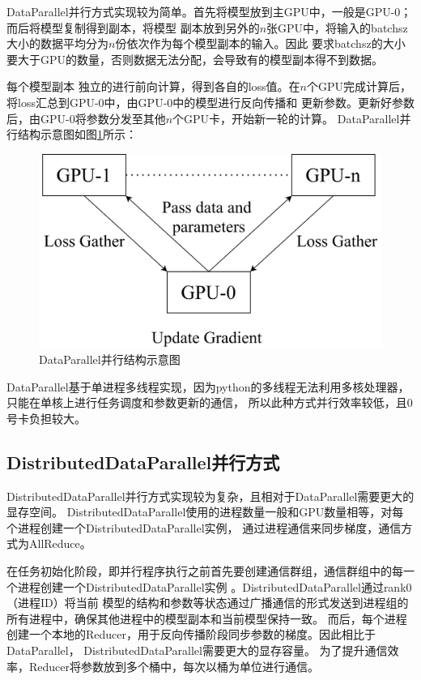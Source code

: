 DataParallel并行方式实现较为简单。首先将模型放到主GPU中，一般是GPU-0；而后将模型复制得到副本，将模型
副本放到另外的$n$张GPU中，将输入的batchsz大小的数据平均分为$n$份依次作为每个模型副本的输入。因此
要求batchsz的大小要大于GPU的数量，否则数据无法分配，会导致有的模型副本得不到数据。

每个模型副本
独立的进行前向计算，得到各自的loss值。在$n$个GPU完成计算后，将loss汇总到GPU-0中，由GPU-0中的模型进行反向传播和
更新参数。更新好参数后，由GPU-0将参数分发至其他$n$个GPU卡，开始新一轮的计算。
DataParallel并行结构示意图如图\ref{fig:dp-stru}所示：

\begin{figure}[h]
    \centering
    \includegraphics[scale=0.15]{figure/dp-structure.png}
    \caption{DataParallel并行结构示意图}
    \label{fig:dp-stru}
\end{figure}

DataParallel基于单进程多线程实现，因为python的多线程无法利用多核处理器，只能在单核上进行任务调度和参数更新的通信，
所以此种方式并行效率较低，且0号卡负担较大。

\subsection{DistributedDataParallel并行方式}

DistributedDataParallel并行方式实现较为复杂，且相对于DataParallel需要更大的显存空间。
DistributedDataParallel使用的进程数量一般和GPU数量相等，对每个进程创建一个DistributedDataParallel实例，
通过进程通信来同步梯度，通信方式为AllReduce\cite{ar}。

在任务初始化阶段，即并行程序执行之前首先要创建通信群组，通信群组中的每一个进程创建一个DistributedDataParallel实例
。DistributedDataParallel通过rank0（进程ID）将当前
模型的结构和参数等状态通过广播通信的形式发送到进程组的所有进程中，确保其他进程中的模型副本和当前模型保持一致。
而后，每个进程创建一个本地的Reducer，用于反向传播阶段同步参数的梯度。因此相比于DataParallel，
DistributedDataParallel需要更大的显存容量。
为了提升通信效率，Reducer将参数放到多个桶中，每次以桶为单位进行通信\cite{bucket}。

